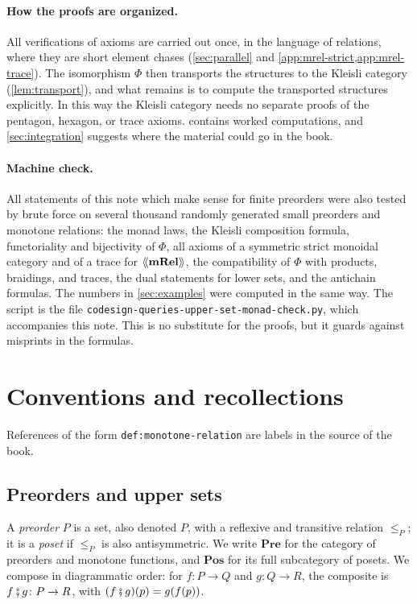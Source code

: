 \documentclass[11pt,a4paper]{article}
\theoremstyle{plain}
\theoremstyle{definition}
\theoremstyle{remark}
\newcommand{\Cat}[1]{\mathbf{#1}}
\newcommand{\Pre}{\Cat{Pre}}
\newcommand{\Pos}{\Cat{Pos}}
\newcommand{\mRel}{\Cat{mRel}}
\providecommand{\llangle}{\mathopen{\langle\mkern-3.5mu\langle}}
\providecommand{\rrangle}{\mathclose{\rangle\mkern-3.5mu\rangle}}
\newcommand{\tL}[1]{\llangle #1 \rrangle}
\newcommand{\then}{\mathbin{\fatsemi}}
\newcommand{\lbl}[1]{\nolinkurl{#1}}
\newcommand{\file}[1]{\nolinkurl{#1}}
\begin{document}
\paragraph{How the proofs are organized.}
All verifications of axioms are carried out once, in the language of relations, where they are short element chases (\cref{sec:parallel} and \cref{app:mrel-strict,app:mrel-trace}).
The isomorphism $\Phi$ then transports the structures to the Kleisli category (\cref{lem:transport}), and what remains is to compute the transported structures explicitly.
In this way the Kleisli category needs no separate proofs of the pentagon, hexagon, or trace axioms.
 contains worked computations, and \cref{sec:integration} suggests where the material could go in the book.

\paragraph{Machine check.}
All statements of this note which make sense for finite preorders were also tested by brute force on several thousand randomly generated small preorders and monotone relations: the monad laws, the Kleisli composition formula, functoriality and bijectivity of $\Phi$, all axioms of a symmetric strict monoidal category and of a trace for $\tL{\mRel}$, the compatibility of $\Phi$ with products, braidings, and traces, the dual statements for lower sets, and the antichain formulas.
The numbers in \cref{sec:examples} were computed in the same way.
The script is the file \file{codesign-queries-upper-set-monad-check.py}, which accompanies this note.
This is no substitute for the proofs, but it guards against misprints in the formulas.

\section{Conventions and recollections}
\label{sec:conventions}

References of the form \lbl{def:monotone-relation} are labels in the source of the book.

\subsection{Preorders and upper sets}

A \emph{preorder} $P$ is a set, also denoted $P$, with a reflexive and transitive relation $\leq_P$; it is a \emph{poset} if $\leq_P$ is also antisymmetric.
We write $\Pre$ for the category of preorders and monotone functions, and $\Pos$ for its full subcategory of posets.
We compose in diagrammatic order: for $f \colon P \to Q$ and $g \colon Q \to R$, the composite is $f \then g \colon P \to R$, with $(f \then g)(p) = g(f(p))$.
\end{document}
